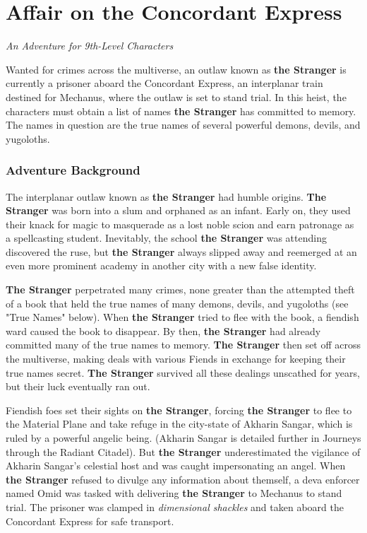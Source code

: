 \documentclass[10pt,a4paper,twoside,bg=print,twocolumn,openany,nodeprecatedcode]{dndarticle}
\date{}
\begin{document}
\part{Affair on the Concordant Express}
\textit{An Adventure for 9th-Level Characters}

Wanted for crimes across the multiverse, an outlaw known as \textbf{the Stranger} is currently a prisoner aboard the Concordant Express, an interplanar train destined for Mechanus, where the outlaw is set to stand trial. In this heist, the characters must obtain a list of names \textbf{the Stranger} has committed to memory. The names in question are the true names of several powerful demons, devils, and yugoloths.

\section{Adventure Background}
The interplanar outlaw known as \textbf{the Stranger} had humble origins. \textbf{The Stranger} was born into a slum and orphaned as an infant. Early on, they used their knack for magic to masquerade as a lost noble scion and earn patronage as a spellcasting student. Inevitably, the school \textbf{the Stranger} was attending discovered the ruse, but \textbf{the Stranger} always slipped away and reemerged at an even more prominent academy in another city with a new false identity.

\textbf{The Stranger} perpetrated many crimes, none greater than the attempted theft of a book that held the true names of many demons, devils, and yugoloths (see "True Names" below). When \textbf{the Stranger} tried to flee with the book, a fiendish ward caused the book to disappear. By then, \textbf{the Stranger} had already committed many of the true names to memory. \textbf{The Stranger} then set off across the multiverse, making deals with various Fiends in exchange for keeping their true names secret. \textbf{The Stranger} survived all these dealings unscathed for years, but their luck eventually ran out.

Fiendish foes set their sights on \textbf{the Stranger}, forcing \textbf{the Stranger} to flee to the Material Plane and take refuge in the city-state of Akharin Sangar, which is ruled by a powerful angelic being. (Akharin Sangar is detailed further in Journeys through the Radiant Citadel). But \textbf{the Stranger} underestimated the vigilance of Akharin Sangar's celestial host and was caught impersonating an angel. When \textbf{the Stranger} refused to divulge any information about themself, a deva enforcer named Omid was tasked with delivering \textbf{the Stranger} to Mechanus to stand trial. The prisoner was clamped in \textit{dimensional shackles} and taken aboard the Concordant Express for safe transport.
\end{document}
